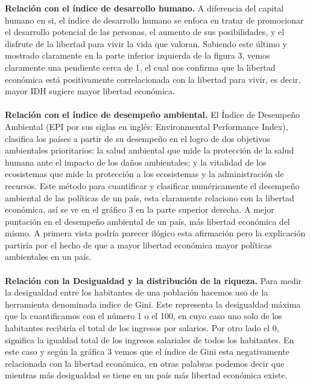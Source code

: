 	\textbf{Relación con el índice de desarrollo humano.}
	A diferencia del capital humano en si, el índice de desarrollo humano se enfoca en tratar de promocionar el desarrollo potencial de las personas, el aumento de sus posibilidades, y el disfrute de la libertad para vivir la vida que valoran. Sabiendo este último y mostrado claramente en la parte inferior izquierda de la figura 3, vemos claramente una pendiente cerca de 1, el cual nos confirma que la libertad económica está positivamente correlacionada con la libertad para vivir, es decir, mayor IDH sugiere mayor libertad económica. \\\\


	\textbf{Relación con el índice de desempeño ambiental.}
	El Índice de Desempeño Ambiental (EPI por sus siglas en inglés: Environmental Performance Index), clasifica los países a partir de su desempeño en el logro de dos objetivos ambientales prioritarios: la salud ambiental que mide la protección de la salud humana ante el impacto de los daños ambientales; y la vitalidad de los ecosistemas que mide la protección a los ecosistemas y la administración de recursos. Este método para cuantificar y clasificar numéricamente el desempeño ambiental de las políticas de un país, esta claramente relaciono con la libertad económica, así se ve en el gráfico 3 en la parte superior derecha. A mejor puntación en el desempeño ambiental de un país, más libertad económica del mismo. A primera vista podría parecer ilógico esta afirmación pero la explicación partiría por el hecho de que a mayor libertad económica mayor políticas ambientales en un país.\\\\
	    
	\textbf{Relación con la Desigualdad y la distribución de la riqueza.}
	Para medir la desigualdad entre los habitantes de una población hacemos uso de la herramienta denominada indice de Gini. Este representa la desigualdad máxima que la cuantificamos con el número 1 o el 100, en cuyo caso uno solo de los habitantes recibiría el total de los ingresos por salarios. Por otro lado el 0, significa la igualdad total de los ingresos salariales de todos los habitantes. En este caso y según la gráfica 3 vemos que el índice de Gini esta negativamente relacionada con la libertad económica, en otras palabras podemos decir que mientras más desigualdad se tiene en un país más libertad económica existe.\\\\

